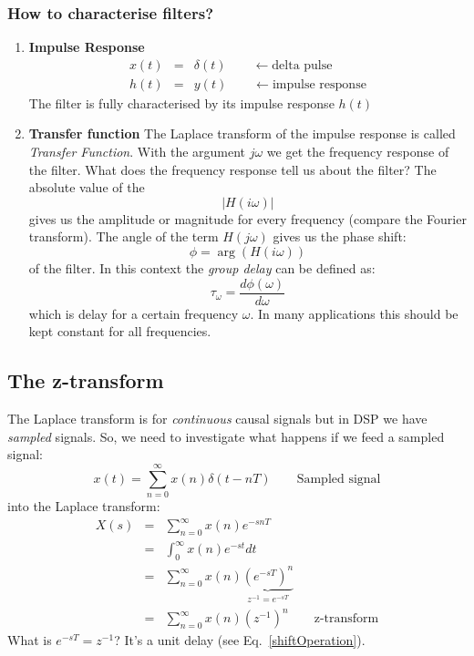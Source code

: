 \documentclass[12pt,a4paper]{article}
\begin{document}
\subsubsection{How to characterise filters?}

\begin{enumerate}
\item{\bf Impulse Response}
\begin{eqnarray}
x(t) & = & \delta(t) \qquad \leftarrow \mbox{delta pulse} \\
h(t) & = & y(t) \qquad \leftarrow \mbox{impulse response}
\end{eqnarray}
The filter is fully characterised by its impulse response $h(t)$

\item{\bf Transfer function}
The Laplace transform of the impulse response is called
\textsl{Transfer Function}. With the argument $j\omega$ we
get the frequency
response of the filter. What does the frequency response tell us about
the filter?  The absolute value of the
\begin{equation}
|H(i \omega)|
\end{equation}
gives us the amplitude or magnitude for every frequency
(compare the Fourier transform).
The angle of the term $H(j\omega)$ gives us the phase shift:
\begin{equation}
\phi = \arg\left(H(i \omega) \right)
\end{equation}
of the filter. In this context the \textsl{group delay} can
be defined as:
\begin{equation}
\tau_{\omega} = \frac{d \phi (\omega)}{d\omega}
\end{equation}
which is delay for a certain frequency $\omega$. In many applications
this should be kept constant for all frequencies.
\end{enumerate}

\subsection{The z-transform}
The Laplace transform is for \textsl{continuous} causal signals but in DSP
we have \textsl{sampled} signals. So, we need to investigate what happens
if we feed a sampled signal:
\begin{equation}
x(t) = \sum_{n = 0}^{\infty} x(n) \delta(t - nT) \qquad \mbox{Sampled signal} 
\end{equation} 
into the Laplace transform:
\begin{eqnarray}
X(s) & = & \sum_{n = 0}^{\infty} x(n) e^{-snT} \\
     & = & \int_{0}^{\infty} x(n) e^{-st} dt \\
     & = & \sum_{n = 0}^{\infty} x(n) \underbrace{(e^{-sT})^{n}}_{z^{-1} = e^{-sT}} \\
     & = & \sum_{n = 0}^{\infty} x(n) (z^{-1})^{n} \qquad \mbox{z-transform}
\end{eqnarray}
What is $e^{-sT} = z^{-1}$? It's a unit delay (see Eq.~\ref{shiftOperation}).
\end{document}
